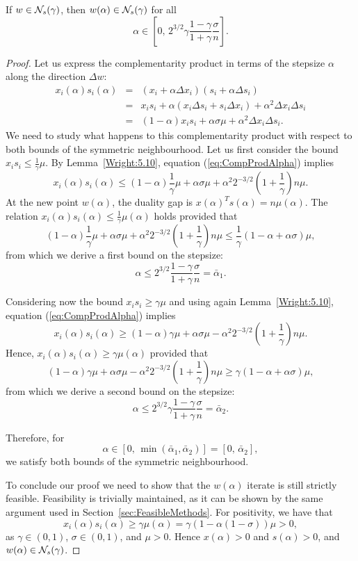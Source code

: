 \begin{theorem} \label{th:SymNeighbourhood}
If $w \in \mathcal{N}_s(\gamma)$, then $w(\alpha) \in \mathcal{N}_s(\gamma)$ for all
\[
  \alpha \in \left[0, \, 2^{3/2}\gamma\frac{1-\gamma}{1+\gamma}
                                      \frac{\sigma}{n} \right].
\]
\end{theorem}
%
\begin{proof}
Let us express the complementarity product in terms of the stepsize 
$\alpha$ along the direction $\Delta w$:
%
\begin{eqnarray} \label{eq:CompProdAlpha}
x_i(\alpha)s_i(\alpha)&=&(x_i+\alpha\Delta x_i)(s_i+\alpha\Delta s_i)\nonumber\\ 
&=& x_is_i+\alpha(x_i\Delta s_i +s_i\Delta x_i) +\alpha^2\Delta x_i\Delta s_i\\
&=& (1-\alpha)x_is_i + \alpha\sigma\mu + \alpha^2\Delta x_i\Delta s_i.\nonumber
\end{eqnarray}
%
We need to study what happens to this complementarity product 
with respect to both bounds of the symmetric neighbourhood.
Let us first consider the bound $x_is_i\le \frac{1}{\gamma}\mu$.
By Lemma~\ref{Wright:5.10}, equation (\ref{eq:CompProdAlpha}) implies
\[
x_i(\alpha)s_i(\alpha) \le (1-\alpha)\frac{1}{\gamma}\mu +\alpha\sigma\mu 
+ \alpha^2 2^{-3/2}\left( 1+ \frac{1}{\gamma} \right)n\mu.
\]
At the new point $w(\alpha)$, the duality gap
is $x(\alpha)^Ts(\alpha) = n\mu(\alpha)$.
The relation $x_i(\alpha)s_i(\alpha)\le \frac{1}{\gamma}\mu(\alpha)$ 
holds provided that
\[
(1-\alpha)\frac{1}{\gamma}\mu +\alpha\sigma\mu + \alpha^2 2^{-3/2}\left( 1+ \frac{1}{\gamma} \right)n\mu 
\le\frac{1}{\gamma}(1-\alpha+\alpha\sigma)\mu,
\]
from which we derive a first bound on the stepsize:
\[
\alpha \le 2^{3/2}\frac{1-\gamma}{1+\gamma}\frac{\sigma}{n} = \bar\alpha_1.
\]

Considering now the bound $x_is_i\ge \gamma\mu$ and using again
Lemma~\ref{Wright:5.10}, equation (\ref{eq:CompProdAlpha}) implies
\[
x_i(\alpha)s_i(\alpha) \ge (1-\alpha)\gamma\mu + \alpha\sigma\mu 
- \alpha^2 2^{-3/2}\left( 1+ \frac{1}{\gamma} \right)n\mu.
\]
Hence, $x_i(\alpha)s_i(\alpha)\ge \gamma\mu(\alpha)$ provided that
\[
(1-\alpha)\gamma\mu + \alpha\sigma\mu- \alpha^2 2^{-3/2}\left( 1+ \frac{1}{\gamma} \right)n\mu 
\ge\gamma(1-\alpha+\alpha\sigma)\mu,
\]
from which we derive a second bound on the stepsize:
\[
\alpha\le 2^{3/2}\gamma\frac{1-\gamma}{1+\gamma}\frac{\sigma}{n} =\bar\alpha_2.
\]

Therefore, for
\[
  \alpha \in [0, \, \min(\bar\alpha_1,\bar\alpha_2)] = [0, \, \bar\alpha_2],
\]
we satisfy both bounds of the symmetric neighbourhood.

To conclude our proof we need to show that the 
$w(\alpha)$ iterate is still strictly feasible.
Feasibility is trivially maintained, as it can be shown
by the same argument used
in Section~\ref{sec:FeasibleMethods}.
For positivity, we have that
\[
  x_i(\alpha)s_i(\alpha) \ge \gamma \mu(\alpha) 
                         = \gamma(1 - \alpha(1-\sigma))\mu > 0,
\]
as $\gamma\in (0,1)$, $\sigma \in (0,1)$, and $\mu > 0$.
Hence $x(\alpha)>0$ and $s(\alpha)>0$, and $w(\alpha) \in \mathcal{N}_s(\gamma)$.
\end{proof}

